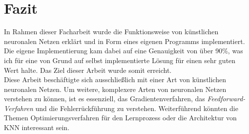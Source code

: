 \section{Fazit}\label{sec:fazit}
In Rahmen dieser Facharbeit wurde die Funktionsweise von künstlichen neuronalen Netzen erklärt und in Form eines eigenen Programms implementiert.
Die eigene Implementierung kam dabei auf eine Genauigkeit von über 90\%, was ich für eine von Grund auf selbst implementierte Lösung für einen sehr guten Wert halte.
Das Ziel dieser Arbeit wurde somit erreicht.\\
Diese Arbeit beschäftigte sich ausschließlich mit einer Art von künstlichen neuronalen Netzen.
Um weitere, komplexere Arten von neuronalen Netzen verstehen zu können, ist es essenziell, das Gradientenverfahren, das \textit{Feedforward-Verfahren} und die Fehlerrückführung zu verstehen.
Weiterführend könnten die Themen Optimierungsverfahren für den Lernprozess oder die Architektur von KNN interessant sein.